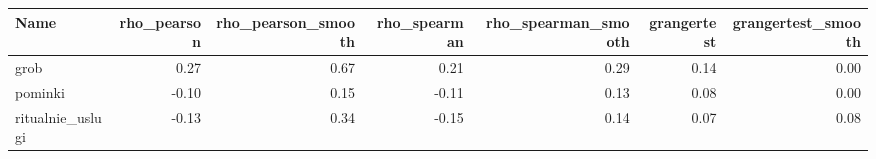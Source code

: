 \begin{table}[ht]
\centering
\begin{tabular}{lrrrrrr}
  \hline
Name & rho\_pearson & rho\_pearson\_smooth & rho\_spearman & rho\_spearman\_smooth & grangertest & grangertest\_smooth \\ 
  \hline
grob & 0.27 & 0.67 & 0.21 & 0.29 & 0.14 & 0.00 \\ 
  pominki & -0.10 & 0.15 & -0.11 & 0.13 & 0.08 & 0.00 \\ 
  ritualnie\_uslugi & -0.13 & 0.34 & -0.15 & 0.14 & 0.07 & 0.08 \\ 
   \hline
\end{tabular}
\end{table}

